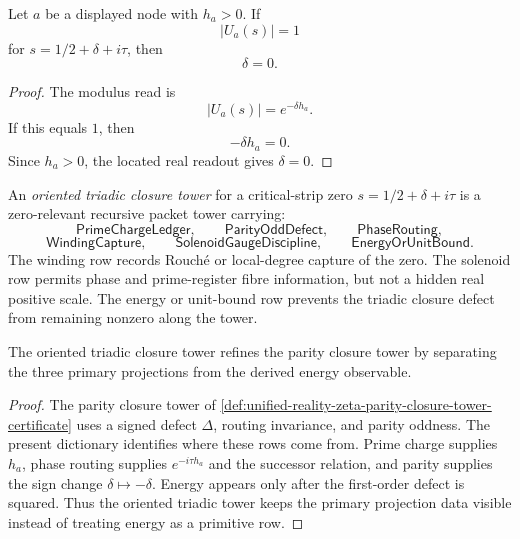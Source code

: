 \begin{theorem}
\label{thm:unified-reality-unit-triadic-closure-forces-fixed-half}
Let $a$ be a displayed node with $h_a>0$.  If
$$
|U_a(s)|=1
$$
for $s=1/2+\delta+i\tau$, then
$$
\delta=0.
$$
\end{theorem}

\begin{proof}
The modulus read is
$$
|U_a(s)|=e^{-\delta h_a}.
$$
If this equals $1$, then
$$
-\delta h_a=0.
$$
Since $h_a>0$, the located real readout gives $\delta=0$.
\end{proof}

\begin{definition}
\label{def:unified-reality-oriented-triadic-closure-tower}
An \emph{oriented triadic closure tower} for a critical-strip zero
$s=1/2+\delta+i\tau$ is a zero-relevant recursive packet tower carrying:
$$
\mathsf{PrimeChargeLedger},
\qquad
\mathsf{ParityOddDefect},
\qquad
\mathsf{PhaseRouting},
$$
$$
\mathsf{WindingCapture},
\qquad
\mathsf{SolenoidGaugeDiscipline},
\qquad
\mathsf{EnergyOrUnitBound}.
$$
The winding row records Rouch\'e or local-degree capture of the zero.
The solenoid row permits phase and prime-register fibre information, but
not a hidden real positive scale.  The energy or unit-bound row prevents
the triadic closure defect from remaining nonzero along the tower.
\end{definition}

\begin{corollary}
\label{cor:unified-reality-oriented-triadic-closure-proof-role-refinement}
The oriented triadic closure tower refines the parity closure tower by
separating the three primary projections from the derived energy
observable.
\end{corollary}

\begin{proof}
The parity closure tower of
\autoref{def:unified-reality-zeta-parity-closure-tower-certificate}
uses a signed defect $\Delta$, routing invariance, and parity oddness.
The present dictionary identifies where these rows come from.  Prime
charge supplies $h_a$, phase routing supplies $e^{-i\tau h_a}$ and the
successor relation, and parity supplies the sign change
$\delta\mapsto-\delta$.  Energy appears only after the first-order
defect is squared.  Thus the oriented triadic tower keeps the primary
projection data visible instead of treating energy as a primitive row.
\end{proof}

